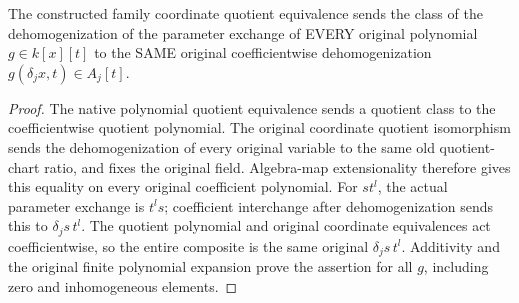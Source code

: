 \begin{lemma}
\label{lem:c0n-original-parameter-coordinate-values}
\leanok
{}
The constructed family coordinate quotient equivalence sends the class of
the dehomogenization of the parameter exchange of EVERY original polynomial
$g\in k[x][t]$ to the SAME original coefficientwise dehomogenization
$g(\delta_jx,t)\in A_j[t]$.
\end{lemma}
\begin{proof}
The native polynomial quotient equivalence sends a quotient class to the
coefficientwise quotient polynomial. The original coordinate quotient
isomorphism sends the dehomogenization of every original variable to the
same old quotient-chart ratio, and fixes the original field. Algebra-map
extensionality therefore gives this equality on every original coefficient
polynomial. For $s t^l$, the actual parameter exchange is $t^l s$;
coefficient interchange after dehomogenization sends this to
$\delta_js\,t^l$. The quotient polynomial and original coordinate equivalences
act coefficientwise, so the entire composite is the same original
$\delta_js\,t^l$. Additivity and the original finite polynomial expansion
prove the assertion for all $g$, including zero and inhomogeneous elements.
\end{proof}

